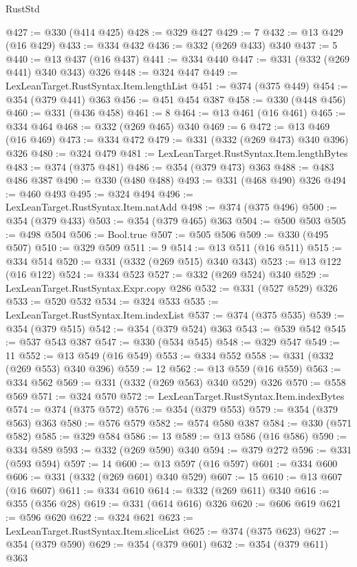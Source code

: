 \begin{lexlean}{RustStd}
\begin{coremodule}
@427 := @330 (@414 @425)
@428 := @329 @427
@429 := 7
@432 := @13 @429 (@16 @429)
@433 := @334 @432
@436 := @332 (@269 @433) @340
@437 := 5
@440 := @13 @437 (@16 @437)
@441 := @334 @440
@447 := @331 (@332 (@269 @441) @340 @343) @326
@448 := @324 @447
@449 := LexLeanTarget.RustSyntax.Item.lengthList
@451 := @374 (@375 @449)
@454 := @354 (@379 @441) @363
@456 := @451 @454 @387
@458 := @330 (@448 @456)
@460 := @331 (@436 @458)
@461 := 8
@464 := @13 @461 (@16 @461)
@465 := @334 @464
@468 := @332 (@269 @465) @340
@469 := 6
@472 := @13 @469 (@16 @469)
@473 := @334 @472
@479 := @331 (@332 (@269 @473) @340 @396) @326
@480 := @324 @479
@481 := LexLeanTarget.RustSyntax.Item.lengthBytes
@483 := @374 (@375 @481)
@486 := @354 (@379 @473) @363
@488 := @483 @486 @387
@490 := @330 (@480 @488)
@493 := @331 (@468 @490) @326
@494 := @460 @493
@495 := @324 @494
@496 := LexLeanTarget.RustSyntax.Item.natAdd
@498 := @374 (@375 @496)
@500 := @354 (@379 @433)
@503 := @354 (@379 @465) @363
@504 := @500 @503
@505 := @498 @504
@506 := Bool.true
@507 := @505 @506
@509 := @330 (@495 @507)
@510 := @329 @509
@511 := 9
@514 := @13 @511 (@16 @511)
@515 := @334 @514
@520 := @331 (@332 (@269 @515) @340 @343)
@523 := @13 @122 (@16 @122)
@524 := @334 @523
@527 := @332 (@269 @524) @340
@529 := LexLeanTarget.RustSyntax.Expr.copy @286
@532 := @331 (@527 @529) @326
@533 := @520 @532
@534 := @324 @533
@535 := LexLeanTarget.RustSyntax.Item.indexList
@537 := @374 (@375 @535)
@539 := @354 (@379 @515)
@542 := @354 (@379 @524) @363
@543 := @539 @542
@545 := @537 @543 @387
@547 := @330 (@534 @545)
@548 := @329 @547
@549 := 11
@552 := @13 @549 (@16 @549)
@553 := @334 @552
@558 := @331 (@332 (@269 @553) @340 @396)
@559 := 12
@562 := @13 @559 (@16 @559)
@563 := @334 @562
@569 := @331 (@332 (@269 @563) @340 @529) @326
@570 := @558 @569
@571 := @324 @570
@572 := LexLeanTarget.RustSyntax.Item.indexBytes
@574 := @374 (@375 @572)
@576 := @354 (@379 @553)
@579 := @354 (@379 @563) @363
@580 := @576 @579
@582 := @574 @580 @387
@584 := @330 (@571 @582)
@585 := @329 @584
@586 := 13
@589 := @13 @586 (@16 @586)
@590 := @334 @589
@593 := @332 (@269 @590) @340
@594 := @379 @272
@596 := @331 (@593 @594)
@597 := 14
@600 := @13 @597 (@16 @597)
@601 := @334 @600
@606 := @331 (@332 (@269 @601) @340 @529)
@607 := 15
@610 := @13 @607 (@16 @607)
@611 := @334 @610
@614 := @332 (@269 @611) @340
@616 := @355 (@356 @28)
@619 := @331 (@614 @616) @326
@620 := @606 @619
@621 := @596 @620
@622 := @324 @621
@623 := LexLeanTarget.RustSyntax.Item.sliceList
@625 := @374 (@375 @623)
@627 := @354 (@379 @590)
@629 := @354 (@379 @601)
@632 := @354 (@379 @611) @363

\end{coremodule}
\end{lexlean}
